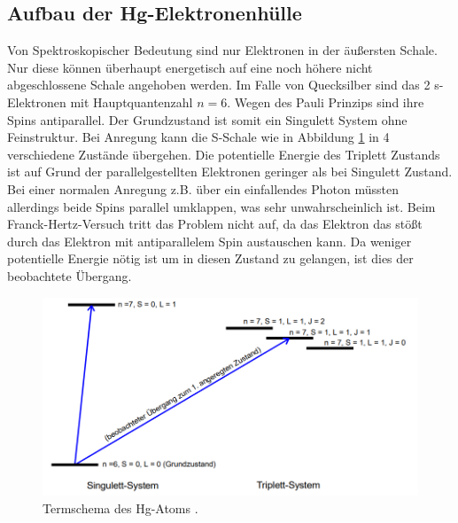 \subsection{Aufbau der Hg-Elektronenhülle}
Von Spektroskopischer Bedeutung sind nur Elektronen in der äußersten Schale. Nur diese 
können überhaupt energetisch auf eine noch höhere nicht abgeschlossene Schale angehoben werden.
Im Falle von Quecksilber sind das 2 s-Elektronen mit Hauptquantenzahl $n=6$. Wegen des Pauli
Prinzips sind ihre Spins antiparallel. Der Grundzustand ist somit ein Singulett System ohne
Feinstruktur. Bei Anregung kann die S-Schale wie in Abbildung \ref{fig:Term} in 4 verschiedene Zustände
übergehen. Die potentielle Energie des Triplett Zustands ist auf Grund der 
parallelgestellten Elektronen geringer als bei Singulett Zustand. Bei einer normalen Anregung 
z.B. über ein einfallendes Photon müssten allerdings beide Spins parallel umklappen, was sehr unwahrscheinlich ist.
Beim Franck-Hertz-Versuch tritt das Problem nicht auf, da das Elektron das stößt durch das Elektron mit antiparallelem 
Spin austauschen kann. Da weniger potentielle Energie nötig ist um in diesen Zustand zu gelangen, ist dies der beobachtete Übergang.
\cite{sample}
\begin{figure}[H]
    \centering
    \includegraphics[scale=0.8]{content/Termschema.png}
    \caption{Termschema des Hg-Atoms \cite{sample}.}
    \label{fig:Term}
\end{figure}
